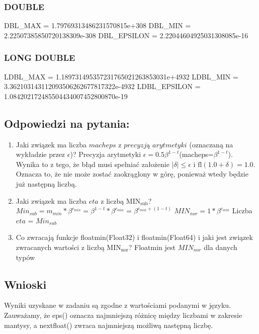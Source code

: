 \documentclass{article}
\begin{document}
\subsubsection{DOUBLE}
DBL\_MAX = 1.79769313486231570815e+308\newline
DBL\_MIN = 2.22507385850720138309e-308\newline
DBL\_EPSILON = 2.22044604925031308085e-16\newline
\subsubsection{LONG DOUBLE}
LDBL\_MAX = 1.189731495357231765021263853031e+4932\newline
LDBL\_MIN = 3.362103143112093506262677817322e-4932\newline
LDBL\_EPSILON = 1.084202172485504434007452800870e-19\newline
\subsection{Odpowiedzi na pytania:}
\begin{enumerate}
\item Jaki związek ma liczba $macheps$ z $precyzją$ $arytmetyki$ (oznaczaną na wykładzie przez $\epsilon$)? \newline
Precyzja arytmetyki $ \epsilon = 0.5\beta^{1-t}$(macheps=$\beta^{1-t}$). Wynika to z tego, że błąd musi spełniać założenie $|\delta| \le \epsilon$ i $\mathrm{fl}(1.0+\delta) = 1.0$. Oznacza to, że nie może zostać zaokrąglony w górę, ponieważ wtedy będzie już następną liczbą.
    \item Jaki związek ma liczba $eta$ z liczbą $\mathrm{MIN}_{\mathrm{sub}}$?\newline
    $Min_{sub}=m_{min}*\beta ^{c_{min}}=\beta ^{1-t}*\beta ^{c_{min}}=\beta ^{c_{min}+(1-t)}$ \newline
    $MIN_{nor}=1*\beta ^{c_{min}}$\newline
    Liczba $eta$ = $Min_{sub}$
    \item Co zwracają funkcje floatmin(Float32) i floatmin(Float64) i jaki jest związek zwracanych wartości z liczbą $\mathrm{MIN}_{\mathrm{nor}}$?\newline
    Floatmin jest $MIN_{nor}$ dla danych typów
\end{enumerate}
\subsection{Wnioski}
Wyniki uzyskane w zadaniu są zgodne z wartościami podanymi w języku. Zauważamy, że eps() oznacza najmniejszą różnicę między liczbami w zakresie mantysy, a nextfloat() zwraca najmniejszą możliwą następną liczbę.
\end{document}
